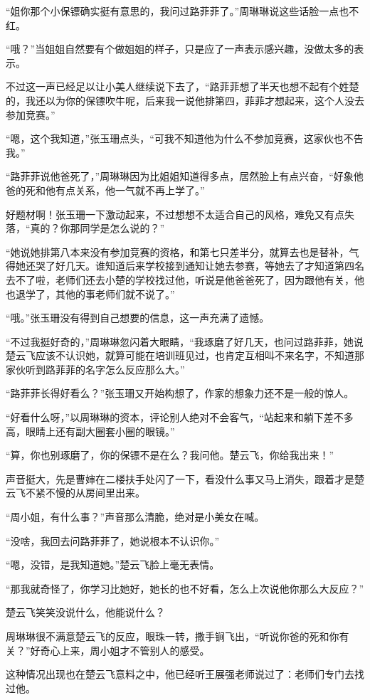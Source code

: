 “姐你那个小保镖确实挺有意思的，我问过路菲菲了。”周琳琳说这些话脸一点也不红。

“哦？”当姐姐自然要有个做姐姐的样子，只是应了一声表示感兴趣，没做太多的表示。

不过这一声已经足以让小美人继续说下去了，“路菲菲想了半天也想不起有个姓楚的，我还以为你的保镖吹牛呢，后来我一说他排第四，菲菲才想起来，这个人没去参加竞赛。”

“嗯，这个我知道，”张玉珊点头，“可我不知道他为什么不参加竞赛，这家伙也不告我。”

“路菲菲说他爸死了，”周琳琳因为比姐姐知道得多点，居然脸上有点兴奋，“好象他爸的死和他有点关系，他一气就不再上学了。”

好题材啊！张玉珊一下激动起来，不过想想不太适合自己的风格，难免又有点失落，“真的？你那同学是怎么说的？”

“她说她排第八本来没有参加竞赛的资格，和第七只差半分，就算去也是替补，气得她还哭了好几天。谁知道后来学校接到通知让她去参赛，等她去了才知道第四名去不了啦，老师们还去小楚的学校找过他，听说是他爸爸死了，因为跟他有关，他也退学了，其他的事老师们就不说了。”

“哦。”张玉珊没有得到自己想要的信息，这一声充满了遗憾。

“不过我挺好奇的，”周琳琳忽闪着大眼睛，“我琢磨了好几天，也问过路菲菲，她说楚云飞应该不认识她，就算可能在培训班见过，也肯定互相叫不来名字，不知道那家伙听到路菲菲的名字怎么反应那么大。”

“路菲菲长得好看么？”张玉珊又开始构想了，作家的想象力还不是一般的惊人。

“好看什么呀，”以周琳琳的资本，评论别人绝对不会客气，“站起来和躺下差不多高，眼睛上还有副大圈套小圈的眼镜。”

“算，你也别琢磨了，你的保镖不是在么？我问他。楚云飞，你给我出来！”

声音挺大，先是曹婶在二楼扶手处闪了一下，看没什么事又马上消失，跟着才是楚云飞不紧不慢的从房间里出来。

“周小姐，有什么事？”声音那么清脆，绝对是小美女在喊。

“没啥，我回去问路菲菲了，她说根本不认识你。”

“嗯，没错，是我知道她。”楚云飞脸上毫无表情。

“那我就奇怪了，你学习比她好，她长的也不好看，怎么上次说他你那么大反应？”

楚云飞笑笑没说什么，他能说什么？

周琳琳很不满意楚云飞的反应，眼珠一转，撒手锏飞出，“听说你爸的死和你有关？”好奇心上来，周小姐才不管别人的感受。

这种情况出现也在楚云飞意料之中，他已经听王展强老师说过了：老师们专门去找过他。

